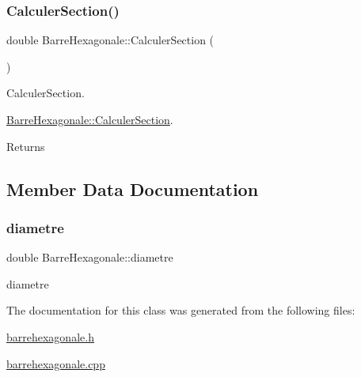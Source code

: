 \subsubsection{\texorpdfstring{Calculer\+Section()}{CalculerSection()}}
{\footnotesize\ttfamily double Barre\+Hexagonale\+::\+Calculer\+Section (\begin{DoxyParamCaption}{ }\end{DoxyParamCaption})}



Calculer\+Section. 

\hyperlink{class_barre_hexagonale_a7b8d80473167ecc5b91ce19d7105390e}{Barre\+Hexagonale\+::\+Calculer\+Section}.

\begin{DoxyReturn}{Returns}

\end{DoxyReturn}


\subsection{Member Data Documentation}
\mbox{\label{class_barre_hexagonale_acd0c0f0b698b467a732e44b28c5c17d1}} 
\subsubsection{\texorpdfstring{diametre}{diametre}}
{\footnotesize\ttfamily double Barre\+Hexagonale\+::diametre\hspace{0.3cm}{\ttfamily [protected]}}



diametre 



The documentation for this class was generated from the following files\+:\begin{DoxyCompactItemize}
\item 
\hyperlink{barrehexagonale_8h}{barrehexagonale.\+h}\item 
\hyperlink{barrehexagonale_8cpp}{barrehexagonale.\+cpp}\end{DoxyCompactItemize}
